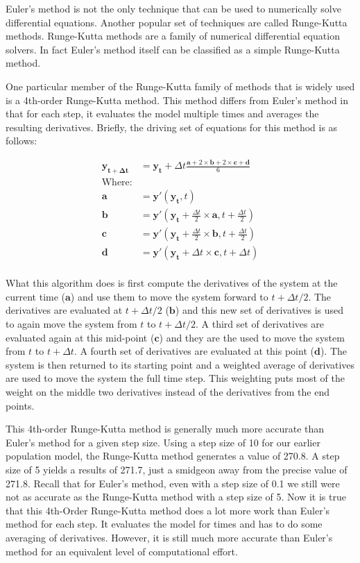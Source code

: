 \documentclass[]{memoir}
\begin{document}
Euler's method is not the only technique that can be used to numerically
solve differential equations. Another popular set of techniques are
called Runge-Kutta methods. Runge-Kutta methods are a family of
numerical differential equation solvers. In fact Euler's method itself
can be classified as a simple Runge-Kutta method.

One particular member of the Runge-Kutta family of methods that is
widely used is a 4th-order Runge-Kutta method. This method differs from
Euler's method in that for each step, it evaluates the model multiple
times and averages the resulting derivatives. Briefly, the driving set
of equations for this method is as follows:

\[
\begin{aligned}
\mathbf{y_{t+\Delta t}} &= \mathbf{y_{t}} + \Delta t \frac{\mathbf{a}+2 \times \mathbf{b}+2 \times \mathbf{c}+\mathbf{d}}{6} \\
\text{Where:} \\
\mathbf{a} &= \mathbf{y'}(\mathbf{y_t}, t) \\
\mathbf{b} &= \mathbf{y'}(\mathbf{y_t}+\frac{\Delta t}{2} \times \mathbf{a}, t+\frac{\Delta t}{2}) \\
\mathbf{c} &= \mathbf{y'}(\mathbf{y_t}+\frac{\Delta t}{2} \times \mathbf{b}, t+\frac{\Delta t}{2}) \\
\mathbf{d} &= \mathbf{y'}(\mathbf{y_t}+\Delta t \times \mathbf{c}, t+\Delta t) \\
\end{aligned}
\]

What this algorithm does is first compute the derivatives of the system
at the current time ($\mathbf{a}$) and use them to move the system
forward to $t+\Delta t/2$. The derivatives are evaluated at
$t+\Delta t/2$ ($\mathbf{b}$) and this new set of derivatives is used to
again move the system from $t$ to $t+\Delta t/2$. A third set of
derivatives are evaluated again at this mid-point ($\mathbf{c}$) and
they are the used to move the system from $t$ to $t+\Delta t$. A fourth
set of derivatives are evaluated at this point ($\mathbf{d}$). The
system is then returned to its starting point and a weighted average of
derivatives are used to move the system the full time step. This
weighting puts most of the weight on the middle two derivatives instead
of the derivatives from the end points.

This 4th-order Runge-Kutta method is generally much more accurate than
Euler's method for a given step size. Using a step size of 10 for our
earlier population model, the Runge-Kutta method generates a value of
270.8. A step size of 5 yields a results of 271.7, just a smidgeon away
from the precise value of 271.8. Recall that for Euler's method, even
with a step size of 0.1 we still were not as accurate as the Runge-Kutta
method with a step size of 5. Now it is true that this 4th-Order
Runge-Kutta method does a lot more work than Euler's method for each
step. It evaluates the model for times and has to do some averaging of
derivatives. However, it is still much more accurate than Euler's method
for an equivalent level of computational effort.
\end{document}
